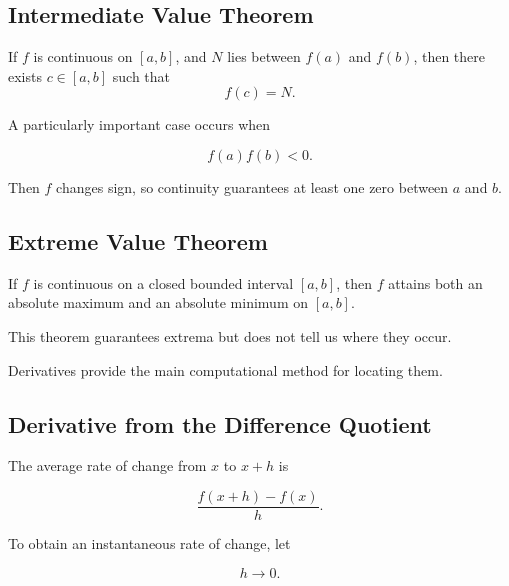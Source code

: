 \subsection{Intermediate Value Theorem}
\label{subsec:intermediate-value-theorem}

\begin{theorem}
If \(f\) is continuous on \([a,b]\), and \(N\) lies between \(f(a)\) and
\(f(b)\), then there exists \(c\in[a,b]\) such that
\[ f(c)=N. \]
\end{theorem}

A particularly important case occurs when

\[ f(a)f(b)<0. \]

Then \(f\) changes sign, so continuity guarantees at least one zero between
\(a\) and \(b\).

\subsection{Extreme Value Theorem}
\label{subsec:extreme-value-theorem}

\begin{theorem}
If \(f\) is continuous on a closed bounded interval \([a,b]\), then \(f\)
attains both an absolute maximum and an absolute minimum on \([a,b]\).
\end{theorem}

This theorem guarantees extrema but does not tell us where they occur.

Derivatives provide the main computational method for locating them.

\subsection{Derivative from the Difference Quotient}
\label{subsec:derivative-definition}

The average rate of change from \(x\) to \(x+h\) is

\[ \frac{f(x+h)-f(x)}{h}. \]

To obtain an instantaneous rate of change, let

\[ h\to0. \]

